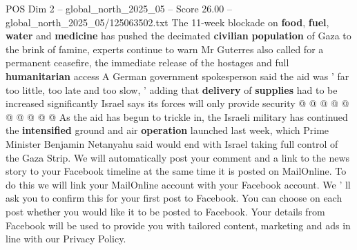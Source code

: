 \begin{textsample}{POS Dim 2 – global\_north\_2025\_05 – Score 26.00 – global\_north\_2025\_05/125063502.txt}
The 11-week blockade on \textbf{food}, \textbf{fuel}, \textbf{water} and \textbf{medicine} has pushed the decimated \textbf{civilian} \textbf{population} of Gaza to the brink of famine, experts continue to warn Mr Guterres also called for a permanent ceasefire, the immediate release of the hostages and full \textbf{humanitarian} access A German government spokesperson said the aid was ' far too little, too late and too slow, ' adding that \textbf{delivery} of \textbf{supplies} had to be increased significantly Israel says its forces will only provide security @ @ @ @ @ @ @ @ @ @ As the aid has begun to trickle in, the Israeli military has continued the \textbf{intensified} ground and air \textbf{operation} launched last week, which Prime Minister Benjamin Netanyahu said would end with Israel taking full control of the Gaza Strip.
We will automatically post your comment and a link to the news story to your Facebook timeline at the same time it is posted on MailOnline.
To do this we will link your MailOnline account with your Facebook account.
We ' ll ask you to confirm this for your first post to Facebook.
You can choose on each post whether you would like it to be posted to Facebook.
Your details from Facebook will be used to provide you with tailored content, marketing and ads in line with our Privacy Policy.

\end{textsample}
